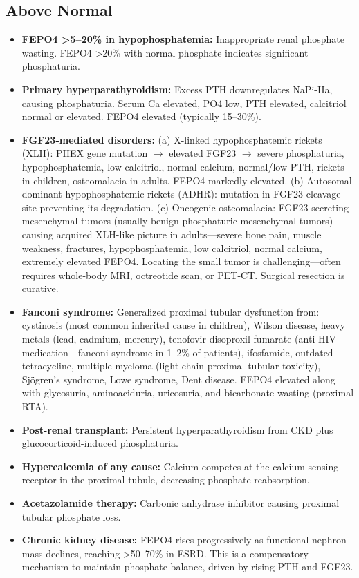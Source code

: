 \subsection*{Above Normal}
\begin{itemize}
  \item \textbf{FEPO4 >5--20\% in hypophosphatemia:} Inappropriate renal phosphate wasting. FEPO4 >20\% with normal phosphate indicates significant phosphaturia.
  \item \textbf{Primary hyperparathyroidism:} Excess PTH downregulates NaPi-IIa, causing phosphaturia. Serum Ca elevated, PO4 low, PTH elevated, calcitriol normal or elevated. FEPO4 elevated (typically 15--30\%).
  \item \textbf{FGF23-mediated disorders:} (a) X-linked hypophosphatemic rickets (XLH): PHEX gene mutation $\rightarrow$ elevated FGF23 $\rightarrow$ severe phosphaturia, hypophosphatemia, low calcitriol, normal calcium, normal/low PTH, rickets in children, osteomalacia in adults. FEPO4 markedly elevated. (b) Autosomal dominant hypophosphatemic rickets (ADHR): mutation in FGF23 cleavage site preventing its degradation. (c) Oncogenic osteomalacia: FGF23-secreting mesenchymal tumors (usually benign phosphaturic mesenchymal tumors) causing acquired XLH-like picture in adults---severe bone pain, muscle weakness, fractures, hypophosphatemia, low calcitriol, normal calcium, extremely elevated FEPO4. Locating the small tumor is challenging---often requires whole-body MRI, octreotide scan, or PET-CT. Surgical resection is curative.
  \item \textbf{Fanconi syndrome:} Generalized proximal tubular dysfunction from: cystinosis (most common inherited cause in children), Wilson disease, heavy metals (lead, cadmium, mercury), tenofovir disoproxil fumarate (anti-HIV medication---fanconi syndrome in 1--2\% of patients), ifosfamide, outdated tetracycline, multiple myeloma (light chain proximal tubular toxicity), Sj\"{o}gren's syndrome, Lowe syndrome, Dent disease. FEPO4 elevated along with glycosuria, aminoaciduria, uricosuria, and bicarbonate wasting (proximal RTA).
  \item \textbf{Post-renal transplant:} Persistent hyperparathyroidism from CKD plus glucocorticoid-induced phosphaturia.
  \item \textbf{Hypercalcemia of any cause:} Calcium competes at the calcium-sensing receptor in the proximal tubule, decreasing phosphate reabsorption.
  \item \textbf{Acetazolamide therapy:} Carbonic anhydrase inhibitor causing proximal tubular phosphate loss.
  \item \textbf{Chronic kidney disease:} FEPO4 rises progressively as functional nephron mass declines, reaching >50--70\% in ESRD. This is a compensatory mechanism to maintain phosphate balance, driven by rising PTH and FGF23.
\end{itemize}

